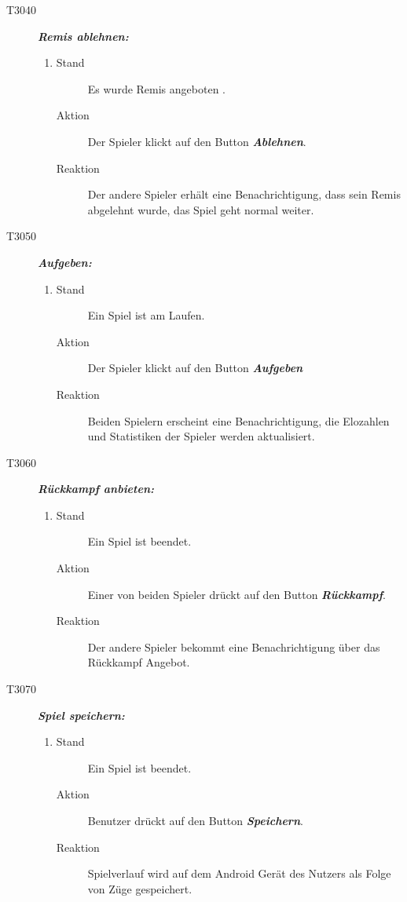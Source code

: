 \documentclass[parskip=full]{scrartcl}
\begin{document}
\begin{description}
		\item[T3040] \textbf{\textit{Remis ablehnen: }} 
		\begin{enumerate}
			\item 
			\begin{description}
				\item[Stand] Es wurde Remis angeboten .
				\item[Aktion] Der Spieler klickt auf den Button \textbf{\textit{Ablehnen}}. 
				\item[Reaktion] Der andere Spieler erhält eine Benachrichtigung, dass sein Remis abgelehnt wurde, das Spiel geht normal weiter.
			\end{description}
		\end{enumerate}
		
		\item[T3050] \textbf{\textit{Aufgeben: }} 
		\begin{enumerate}
			\item 
			\begin{description}
				\item[Stand] Ein Spiel ist am Laufen.
				\item[Aktion] Der Spieler klickt auf den Button \textbf{\textit{Aufgeben}} 
				\item[Reaktion] Beiden Spielern erscheint eine Benachrichtigung, die Elozahlen und Statistiken der Spieler werden aktualisiert.
			\end{description}
		\end{enumerate}
		
		\item[T3060] \textbf{\textit{Rückkampf anbieten: }} 
		\begin{enumerate}
			\item 
			\begin{description}
				\item[Stand] Ein Spiel ist beendet.
				\item[Aktion] Einer von beiden Spieler drückt auf den Button \textbf{\textit{Rückkampf}}.
				\item[Reaktion] Der andere Spieler bekommt eine Benachrichtigung über das Rückkampf Angebot.
			\end{description}
		\end{enumerate}
		
		\item[T3070] \textbf{\textit{Spiel speichern: }} 
		\begin{enumerate}
			\item 
			\begin{description}
				\item[Stand] Ein Spiel ist beendet.
				\item[Aktion] Benutzer drückt auf den Button \textbf{\textit{Speichern}}.
				\item[Reaktion] Spielverlauf wird auf dem \gls{Android} Gerät des Nutzers als Folge von Züge gespeichert.
			\end{description}
		\end{enumerate}
		
		
	\end{description}
	
\end{document}
